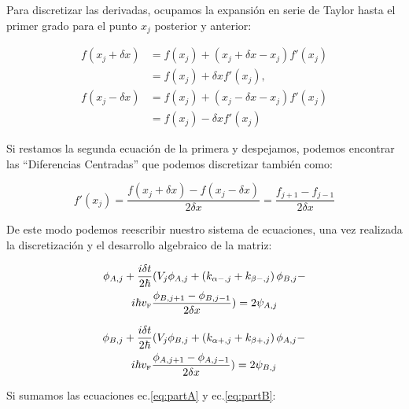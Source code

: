     Para discretizar las derivadas, ocupamos la expansión en serie de Taylor hasta el primer grado para el punto $x_j$ posterior y anterior:

    \begin{align}
        \label{eq:TaylorBeforeAndAfter}
        f(x_j+\delta x)&=f(x_j) + (x_j+\delta x-x_j)f'(x_j)\nonumber\\
        &=f(x_j)+\delta xf'(x_j),\nonumber\\
        f(x_j-\delta x)&=f(x_j) + (x_j-\delta x-x_j)f'(x_j)\nonumber\\
        &=f(x_j)-\delta xf'(x_j)
    \end{align}

    \noindent Si restamos la segunda ecuación de la primera y despejamos, podemos encontrar las ``Diferencias Centradas'' que podemos discretizar también como:

    \begin{equation}
        \label{eq:diferenciasCentradas}
        f'(x_j)=\frac{f(x_j+\delta x)-f(x_j-\delta x)}{2\delta x} = \frac{f_{j+1}-f_{j-1}}{2\delta x}
    \end{equation}

    De este modo podemos reescribir nuestro sistema de ecuaciones, una vez realizada la discretización y el desarrollo algebraico de la matriz:

    \begin{multline}
        \label{eq:partA}
        \phi_{A, j} + \frac{i\delta t}{2\hbar}(V_j\phi_{A,j} + \left(k_{\alpha-,j}+k_{\beta-,j}\right)\phi_{B,j}-\\
        i\hbar v_{\mbox{\tiny F}}\frac{\phi_{B, j+1}-\phi_{B, j-1}}{2\delta x}) = 2\psi_{A,j}
    \end{multline}

    \begin{multline}
        \label{eq:partB}
        \phi_{B, j} + \frac{i\delta t}{2\hbar}(V_j\phi_{B,j} + \left(k_{\alpha+,j}+k_{\beta+,j}\right)\phi_{A,j}-\\
        i\hbar v_{\mbox{\tiny F}}\frac{\phi_{A, j+1}-\phi_{A, j-1}}{2\delta x}) = 2\psi_{B,j}
    \end{multline}
    
    Si sumamos las ecuaciones ec.\eqref{eq:partA} y ec.\eqref{eq:partB}:

